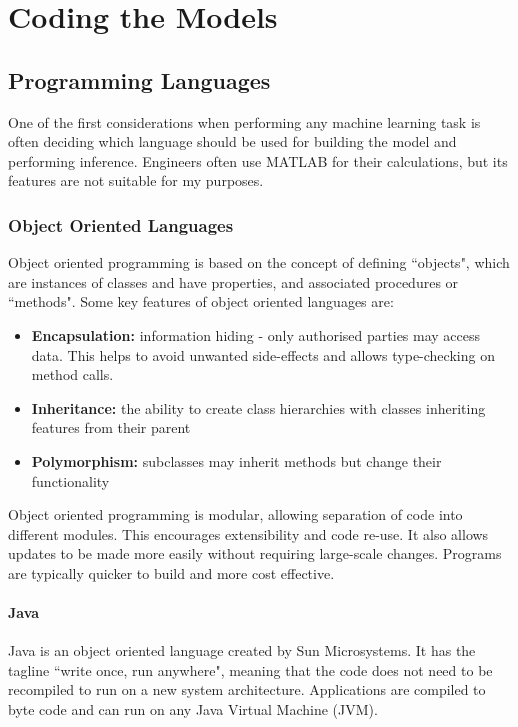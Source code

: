 \chapter{Coding the Models}\label{chap:codingTheModels}

\section{Programming Languages}

One of the first considerations when performing any machine learning task is often deciding which language should be used for building the model and performing inference. Engineers often use MATLAB for their calculations, but its features are not suitable for my purposes.

\subsection{Object Oriented Languages}

Object oriented programming is based on the concept of defining ``objects", which are instances of classes and have properties, and associated procedures or ``methods". Some key features of object oriented languages are:

\begin{itemize}

\item \textbf{Encapsulation:} information hiding - only authorised parties may access data. This helps to avoid unwanted side-effects and allows type-checking on method calls.
\item \textbf{Inheritance:} the ability to create class hierarchies with classes inheriting features from their parent
\item \textbf{Polymorphism:} subclasses may inherit methods but change their functionality

\end{itemize}

Object oriented programming is modular, allowing separation of code into different modules. This encourages extensibility and code re-use. It also allows updates to be made more easily without requiring large-scale changes. Programs are typically quicker to build and more cost effective.

\subsubsection{Java}

Java is an object oriented language created by Sun Microsystems. It has the tagline ``write once, run anywhere", meaning that the code does not need to be recompiled to run on a new system architecture. Applications are compiled to byte code and can run on any Java Virtual Machine (JVM).


